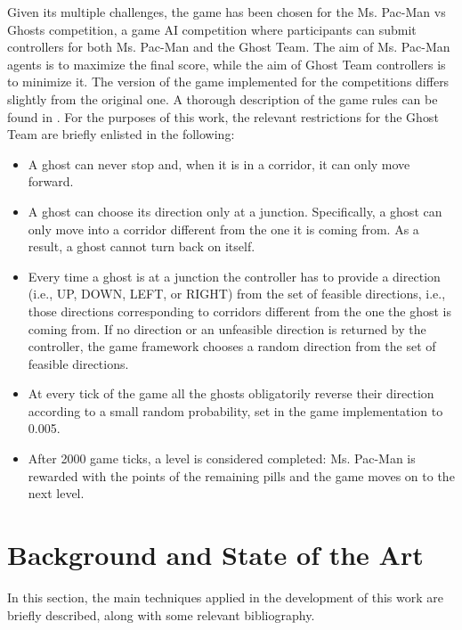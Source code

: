 \documentclass[a4paper]{llncs}
\begin{document}
Given its multiple challenges, the game has been chosen for the Ms. Pac-Man vs Ghosts competition, a game AI competition where participants can submit controllers for both Ms. Pac-Man and the Ghost Team. The aim of Ms. Pac-Man agents is to maximize the final score, while the aim of Ghost Team controllers is to minimize it. The version of the game implemented for the competitions differs slightly from the original one. A thorough description of the game rules can be found in \cite{MsPacManVSGhost2011}. For the purposes of this work, the relevant restrictions for the Ghost Team are briefly enlisted in the following:
\begin{itemize}
  \item A ghost can never stop and, when it is in a corridor, it can only move forward.
  \item A ghost can choose its direction only at a junction. Specifically, a ghost can only move into a corridor different from the one it is coming from. As a result, a ghost cannot turn back on itself.
  \item Every time a ghost is at a junction the controller has to provide a direction (i.e., UP, DOWN, LEFT, or RIGHT) from the set of feasible directions, i.e., those directions corresponding to corridors different from the one the ghost is coming from. If no direction or an unfeasible direction is returned by the controller, the game framework chooses a random direction from the set of feasible directions.
  \item At every tick of the game all the ghosts obligatorily reverse their direction according to a small random probability, set in the game implementation to 0.005.
  \item After 2000 game ticks, a level is considered completed: Ms. Pac-Man is rewarded with the points of the remaining pills and the game moves on to the next level.
\end{itemize}

%
%
\section{Background and State of the Art}
\label{sec:preliminaryconcepts_sota}

In this section, the main techniques applied in the development of this work are briefly described, along with some relevant bibliography.
\end{document}
